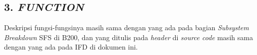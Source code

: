 \subsection*{\textcolor{subsectioncolor}{\textsf{3. \textit{FUNCTION}}}}

Deskripsi fungsi-fungsinya masih sama dengan yang ada pada bagian \textit{Subsystem Breakdown} SFS di B200,
dan yang ditulis pada \textit{header} di \textit{source code} masih sama dengan yang ada pada IFD di dokumen ini.
